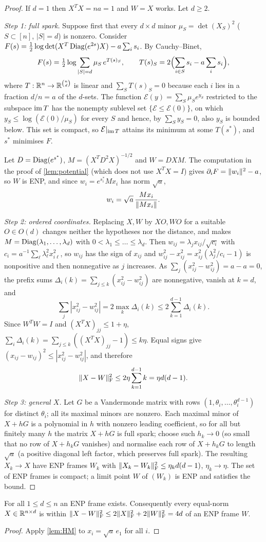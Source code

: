 \begin{proof}
If $d=1$ then $X^TX=na=1$ and $W=X$ works. Let $d\ge2$.

\emph{Step 1: full spark.} Suppose first that every $d\times d$ minor
$\mu_S=\det(X_S)^2$ ($S\subset[n]$, $|S|=d$) is nonzero. Consider
$F(s)=\frac12\log\det(X^T\operatorname{Diag}(e^{2s})X)-a\sum_is_i$. By Cauchy--Binet,
\[
 F(s)=\tfrac12\log\sum_{|S|=d}\mu_S\,e^{T(s)_S},\qquad
 T(s)_S=2\Bigl(\sum_{i\in S}s_i-a\sum_{i}s_i\Bigr),
\]
where $T:\mathbb R^n\to\mathbb R^{\binom nd}$ is linear and $\sum_ST(s)_S=0$ because each $i$
lies in a fraction $d/n=a$ of the $d$-sets. The function
$\mathcal E(y)=\sum_S\mu_Se^{y_S}$ restricted to the subspace $\operatorname{im} T$ has the
nonempty sublevel set $\{\mathcal E\le\mathcal E(0)\}$, on which
$y_S\le\log(\mathcal E(0)/\mu_S)$ for every $S$ and hence, by $\sum_Sy_S=0$,
also $y_S$ is bounded below. This set is compact, so $\mathcal E|_{\operatorname{im} T}$
attains its minimum at some $T(s^*)$, and $s^*$ minimises $F$.

Let $D=\operatorname{Diag}(e^{s^*})$, $M=(X^TD^2X)^{-1/2}$ and $W=DXM$. The computation in
the proof of \cref{lem:potential} (which does not use $X^TX=I$) gives
$\partial_iF=\lVert w_i\rVert^2-a$, so $W$ is ENP, and since
$w_i=e^{s^*_i}Mx_i$ has norm $\sqrt a$,
\[
 w_i=\sqrt a\,\frac{Mx_i}{\lVert Mx_i\rVert}.
\]

\emph{Step 2: ordered coordinates.} Replacing $X,W$ by $XO,WO$ for a suitable
$O\in O(d)$ changes neither the hypotheses nor the distance, and makes
$M=\operatorname{Diag}(\lambda_1,\dots,\lambda_d)$ with $0<\lambda_1\le\dots\le\lambda_d$.
Then $w_{ij}=\lambda_jx_{ij}/\sqrt{c_i}$ with
$c_i=a^{-1}\sum_\ell\lambda_\ell^2x_{i\ell}^2$, so $w_{ij}$ has the sign of
$x_{ij}$ and $w_{ij}^2-x_{ij}^2=x_{ij}^2(\lambda_j^2/c_i-1)$ is nonpositive and
then nonnegative as $j$ increases. As $\sum_j(x_{ij}^2-w_{ij}^2)=a-a=0$, the
prefix sums $\Delta_i(k)=\sum_{j\le k}(x_{ij}^2-w_{ij}^2)$ are nonnegative,
vanish at $k=d$, and
\[
 \sum_j|x_{ij}^2-w_{ij}^2|=2\max_k\Delta_i(k)\le2\sum_{k=1}^{d-1}\Delta_i(k).
\]
Since $W^TW=I$ and $(X^TX)_{jj}\le1+\eta$,
$\sum_i\Delta_i(k)=\sum_{j\le k}((X^TX)_{jj}-1)\le k\eta$. Equal signs give
$(x_{ij}-w_{ij})^2\le|x_{ij}^2-w_{ij}^2|$, and therefore
\[
 \lVert X-W\rVert_{\mathrm F}^2\le2\eta\sum_{k=1}^{d-1}k=\eta d(d-1).
\]

\emph{Step 3: general $X$.} Let $G$ be a Vandermonde matrix with rows
$(1,\theta_i,\dots,\theta_i^{d-1})$ for distinct $\theta_i$; all its maximal
minors are nonzero. Each maximal minor of $X+hG$ is a polynomial in $h$ with
nonzero leading coefficient, so for all but finitely many $h$ the matrix $X+hG$
is full spark; choose such $h_k\to0$ (so small that no row of $X+h_kG$
vanishes) and normalise each row of $X+h_kG$ to length $\sqrt a$ (a positive diagonal left factor, which preserves full spark).
The resulting $X_k\to X$ have ENP frames $W_k$ with
$\lVert X_k-W_k\rVert_{\mathrm F}^2\le\eta_kd(d-1)$, $\eta_k\to\eta$. The set of ENP frames is
compact; a limit point $W$ of $(W_k)$ is ENP and satisfies the bound.
\end{proof}

\begin{corollary}\label{cor:exist}
For all $1\le d\le n$ an ENP frame exists. Consequently every equal-norm
$X\in\mathbb R^{n\times d}$ is within $\lVert X-W\rVert_{\mathrm F}^2\le2\lVert X\rVert_{\mathrm F}^2+2\lVert W\rVert_{\mathrm F}^2=4d$ of an ENP
frame $W$.
\end{corollary}

\begin{proof}
Apply \cref{lem:HM} to $x_i=\sqrt a\,e_1$ for all $i$.
\end{proof}

